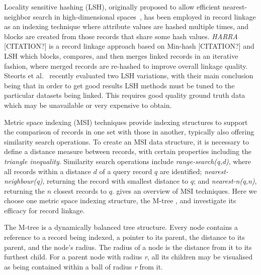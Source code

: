 \documentclass{llncs}
\begin{document}
Locality sensitive hashing (LSH), originally proposed to allow
efficient nearest-neighbor search in high-dimensional
spaces~\cite{Ind98}, has been employed in record linkage as an indexing
technique where attribute values are hashed multiple times, and
blocks are created from those records that share some hash values.
\emph{HARRA} [CITATION?] is a record linkage approach based on Min-hash
[CITATION?] and LSH
which blocks, compares, and then merges linked records in an iterative
fashion, where merged records are re-hashed to improve overall linkage
quality. Steorts et al.~\cite{Steorts2014} recently evaluated two LSH
variations, with their main conclusion being that in order to get good
results LSH methods must be tuned to the particular datasets being
linked. This requires good quality ground truth data which may be
unavailable or very expensive to obtain.

Metric space indexing (MSI) techniques provide indexing structures to
support the comparison of records in one set with those in another,
typically also offering similarity search operations. To create an MSI
data structure, it is necessary to define a distance measure between
records, with certain properties including the \emph{triangle
inequality}. Similarity search operations include
\textit{range-search(q,d)}, where all records within a distance $d$ of a
query record $q$ are identified; \textit{nearest-neighbour(q)},
returning the record with smallest distance to $q$; and
\textit{nearest-n(q,n)}, returning the $n$ closest records to $q$.
\cite{Zezula2010} gives an overview of MSI techniques.
Here we choose one metric space indexing structure, the M-tree
\cite{paolociaccia2m}, and investigate its efficacy for record linkage.


The M-tree is a dynamically balanced tree structure. Every node contains
a reference to a record being indexed, a pointer to its parent, the
distance to its parent, and the node's radius. The radius of a node is
the distance from it to its furthest child. For a parent node with
radius \textit{r}, all its children may be visualised as being contained
within a ball of radius \textit{r} from it.
\end{document}
